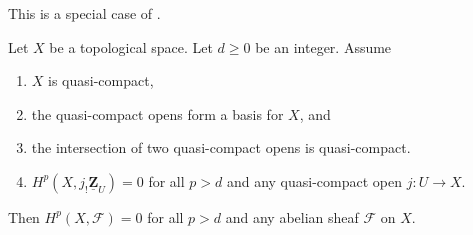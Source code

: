 \begin{lemma}
\label{lemma-vanishing-generated-one-section}
\begin{reference}
This is a special case of \cite[Proposition 3.6.1]{Tohoku}.
\end{reference}
Let $X$ be a topological space. Let $d \geq 0$ be an integer. Assume
\begin{enumerate}
\item $X$ is quasi-compact,
\item the quasi-compact opens form a basis for $X$, and
\item the intersection of two quasi-compact opens is quasi-compact.
\item $H^p(X, j_!\underline{\mathbf{Z}}_U) = 0$ for all $p > d$
and any quasi-compact open $j : U \to X$.
\end{enumerate}
Then $H^p(X, \mathcal{F}) = 0$ for all $p > d$
and any abelian sheaf $\mathcal{F}$ on $X$.
\end{lemma}

